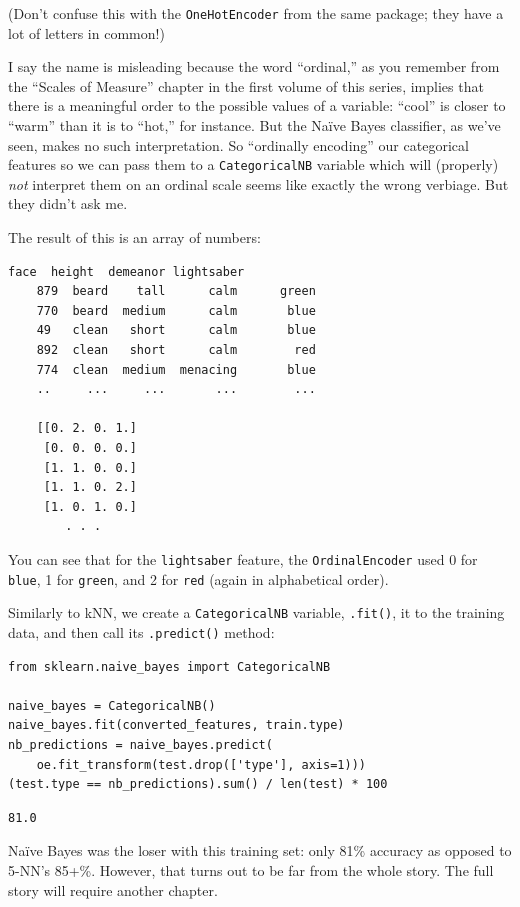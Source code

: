 (Don't confuse this with the \texttt{OneHotEncoder} from the same package; they
have a lot of letters in common!)


I say the name is misleading because the word ``ordinal,'' as you remember from
the ``Scales of Measure'' chapter in the first volume of this series, implies
that there is a meaningful order to the possible values of a variable: ``cool''
is closer to ``warm'' than it is to ``hot,'' for instance. But the Na\"{i}ve
Bayes classifier, as we've seen, makes no such interpretation. So ``ordinally
encoding'' our categorical features so we can pass them to a
\texttt{CategoricalNB} variable which will (properly) \textit{not} interpret
them on an ordinal scale seems like exactly the wrong verbiage. But they didn't
ask me.

The result of this is an array of numbers:

\begin{Verbatim}[fontsize=\small,samepage=true,frame=leftline,framesep=5mm,framerule=1mm]
          face  height  demeanor lightsaber
    879  beard    tall      calm      green
    770  beard  medium      calm       blue
    49   clean   short      calm       blue
    892  clean   short      calm        red
    774  clean  medium  menacing       blue
    ..     ...     ...       ...        ...

    [[0. 2. 0. 1.]
     [0. 0. 0. 0.]
     [1. 1. 0. 0.]
     [1. 1. 0. 2.]
     [1. 0. 1. 0.]
        . . .
\end{Verbatim}

You can see that for the \texttt{lightsaber} feature, the
\texttt{OrdinalEncoder} used 0 for \texttt{blue}, 1 for \texttt{green}, and 2
for \texttt{red} (again in alphabetical order).

\medskip
Similarly to kNN, we create a \texttt{CategoricalNB} variable, \texttt{.fit()},
it to the training data, and then call its \texttt{.predict()} method:

\begin{Verbatim}[fontsize=\footnotesize,samepage=true,frame=single,framesep=3mm]
from sklearn.naive_bayes import CategoricalNB

naive_bayes = CategoricalNB()
naive_bayes.fit(converted_features, train.type)
nb_predictions = naive_bayes.predict(
    oe.fit_transform(test.drop(['type'], axis=1)))
(test.type == nb_predictions).sum() / len(test) * 100
\end{Verbatim}
\vspace{-.2in}

\begin{Verbatim}[fontsize=\small,samepage=true,frame=leftline,framesep=5mm,framerule=1mm]
81.0
\end{Verbatim}

Na\"{i}ve Bayes was the loser with this training set: only 81\% accuracy as
opposed to 5-NN's 85+\%. However, that turns out to be far from the whole
story. The full story will require another chapter.